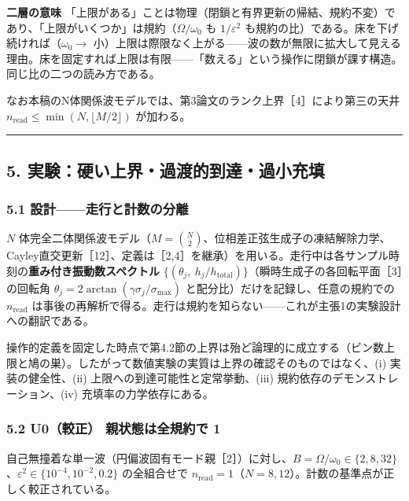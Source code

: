 \documentclass[
  a4paper,
]{ltjsarticle}
\begin{document}
\textbf{二層の意味}
「上限がある」ことは物理（閉鎖と有界更新の帰結、規約不変）であり、「上限がいくつか」は規約（\(\Omega/\omega_0\)
も \(1/\varepsilon^2\)
も規約の比）である。床を下げ続ければ（\(\omega_0\to\)
小）上限は際限なく上がる------波の数が無限に拡大して見える理由。床を固定すれば上限は有限------「数える」という操作に閉鎖が課す構造。同じ比の二つの読み方である。

なお本稿のN体関係波モデルでは、第3論文のランク上界［4］により第三の天井
\(n_{\mathrm{read}}\le\min(N,\lfloor M/2\rfloor)\) が加わる。

\begin{center}\rule{0.5\linewidth}{0.5pt}\end{center}

\subsection{5.
実験：硬い上界・過渡的到達・過小充填}\label{ux5b9fux9a13ux786cux3044ux4e0aux754cux904eux6e21ux7684ux5230ux9054ux904eux5c0fux5145ux586b}

\subsubsection{5.1
設計------走行と計数の分離}\label{ux8a2dux8a08ux8d70ux884cux3068ux8a08ux6570ux306eux5206ux96e2}

\(N\)
体完全二体関係波モデル（\(M=\binom N2\)、位相差正弦生成子の凍結解除力学、Cayley直交更新［12］、定義は［2,4］を継承）を用いる。走行中は各サンプル時刻の\textbf{重み付き振動数スペクトル}
\(\{(\theta_j,\ h_j/h_{\mathrm{total}})\}\)（瞬時生成子の各回転平面［3］の回転角
\(\theta_j=2\arctan(\gamma\sigma_j/\sigma_{\max})\)
と配分比）だけを記録し、任意の規約での \(n_{\mathrm{read}}\)
は事後の再解析で得る。走行は規約を知らない------これが主張1の実験設計への翻訳である。

操作的定義を固定した時点で第4.2節の上界は殆ど論理的に成立する（ビン数上限と鳩の巣）。したがって数値実験の実質は上界の確認そのものではなく、(i)
実装の健全性、(ii) 上限への到達可能性と定常挙動、(iii)
規約依存のデモンストレーション、(iv) 充填率の力学依存にある。

\subsubsection{5.2 U0（較正） 親状態は全規約で
1}\label{u0ux8f03ux6b63-ux89aaux72b6ux614bux306fux5168ux898fux7d04ux3067-1}

自己無撞着な単一波（円偏波固有モード親［2］）に対し、\(B=\Omega/\omega_0\in\{2,8,32\}\)、\(\varepsilon^2\in\{10^{-4},10^{-2},0.2\}\)
の全組合せで
\(n_{\mathrm{read}}=1\)（\(N=8,12\)）。計数の基準点が正しく較正されている。
\end{document}
